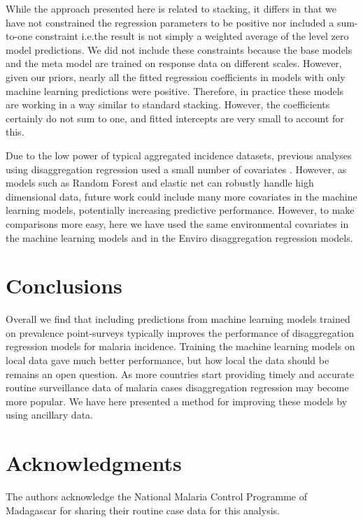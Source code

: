 \documentclass[review]{elsarticle}
\begin{document}
While the approach presented here is related to stacking, it differs in that we have not constrained the regression parameters to be positive nor included a sum-to-one constraint i.e.\thinspace the result is not simply a weighted average of the level zero model predictions.
We did not include these constraints because the base models and the meta model are trained on response data on different scales.
However, given our priors, nearly all the fitted regression coefficients in models with only machine learning predictions were positive.
Therefore, in practice these models are working in a way similar to standard stacking.
However, the coefficients certainly do not sum to one, and fitted intercepts are very small to account for this.


Due to the low power of typical aggregated incidence datasets, previous analyses using disaggregation regression used a small number of covariates \citep{sturrock2014fine}.
However, as models such as Random Forest and elastic net can robustly handle high dimensional data, future work could include many more covariates in the machine learning models, potentially increasing predictive performance.
However, to make comparisons more easy, here we have used the same environmental covariates in the machine learning models and in the Enviro disaggregation regression models.



\section{Conclusions}

Overall we find that including predictions from machine learning models trained on prevalence point-surveys typically improves the performance of disaggregation regression models for malaria incidence.
Training the machine learning models on local data gave much better performance, but how local the data should be remains an open question.
As more countries start providing timely and accurate routine surveillance data of malaria cases disaggregation regression may become more popular.
We have here presented a method for improving these models by using ancillary data.



\section*{Acknowledgments}
The authors acknowledge the National Malaria Control Programme of Madagascar for sharing their routine case data for this analysis.

 
%
%
\end{document}
